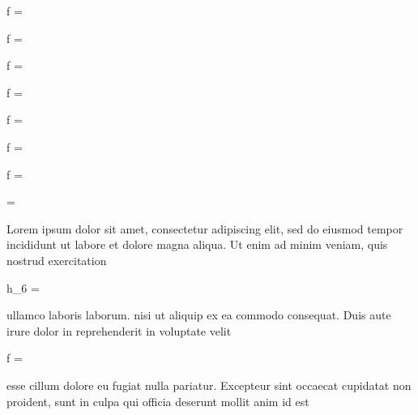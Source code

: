 \documentclass[preview]{standalone}
\begin{document}
\begin{form}
	f =  
\end{form}

\begin{form}
	f =   
\end{form}

\begin{form}
	f = 
\end{form}
	
\begin{form}
f = 
\end{form}
	
\begin{form}
	f = 
\end{form}
	
\begin{form}
f = 
\end{form}

\begin{form}
	f = 
\end{form}

\begin{form}
	 = 
\end{form}

Lorem ipsum dolor sit amet, consectetur adipiscing elit, sed do eiusmod tempor incididunt ut labore et dolore magna 
aliqua. Ut enim ad minim veniam, quis nostrud exercitation \begin{forminline}
	h_6 = 
\end{forminline} ullamco laboris laborum. nisi ut aliquip ex ea commodo consequat. Duis aute irure dolor in 
reprehenderit in voluptate velit \begin{forminline}
	f = 
\end{forminline} esse cillum dolore eu fugiat nulla pariatur. Excepteur sint occaecat cupidatat non 
proident, sunt in culpa qui officia deserunt mollit anim id est
\end{document}

